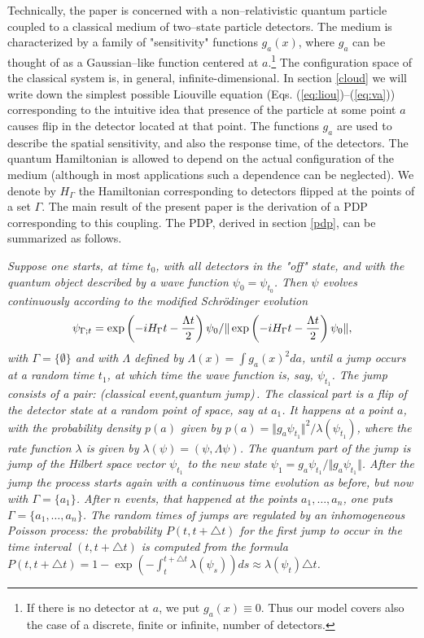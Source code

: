 \documentclass[12pt]{article}
\begin{document}
Technically, the paper is concerned with a non--relativistic quantum
particle coupled to a classical medium of two--state particle detectors.
The medium is characterized by a family of "sensitivity" functions
$g_a(x)$, where $g_a$ can be thought of as a Gaussian--like function
centered at $a$.\footnote{If there is no detector at $a$, we put
$g_a(x)\equiv0$. Thus our model covers also the case of a discrete, finite
or infinite, number of detectors.} The configuration space of the classical
system is, in general, infinite-dimensional. In section \ref{cloud} we will write down
the simplest possible Liouville equation (Eqs.
(\ref{eq:liou})--(\ref{eq:va})) corresponding to the intuitive idea that
presence of the particle at some point $a$ causes flip in the detector
located at that point. The functions $g_a$ are used to describe the spatial
sensitivity, and also the response time, of the detectors. The quantum
Hamiltonian is allowed to depend on the actual configuration of the medium
(although in most applications such a dependence can be neglected). We
denote by $H_\Gamma$ the Hamiltonian corresponding to detectors flipped at
the points of a set $\Gamma$. The main result of the present paper is the
derivation of a PDP corresponding to this coupling. The PDP, derived in section
\ref{pdp}, can be summarized as follows.

\medskip
{\sl Suppose one starts, at time $t_0$, with all detectors in the "off"
state, and with the quantum object described by a wave function $\psi
_0=\psi_{t_0}$. Then $\psi$ evolves continuously according to the modified
Schr\"odinger evolution
$$\psi_{\Gamma;t}=\exp\left(-iH_\Gamma t-{{\Lambda t}\over 2}\right)\psi_0
/{\Vert \exp\left(-iH_\Gamma t-{{\Lambda t}\over 2}\right)\psi_0\Vert},$$
with $\Gamma=\{\emptyset \}$ and with $\Lambda$ defined by $\Lambda
(x)=\int g_a(x)^2 da$, until a jump occurs at a random time $t_1$, at which
time the wave function is, say, $\psi_{t_1}$. The jump consists of a pair:
{\sl (classical event,quantum jump)}\,. The classical part is a flip of the
detector state at a random point of space, say at $a_1$. It happens at a
point $a$, with the probability density $p(a)$ given by  $p(a)=\Vert g_a
\psi_{t_1}\Vert^2/\lambda(\psi_{t_1})$,
where the rate function $\lambda$ is given by
$\lambda(\psi)=(\psi,\Lambda\psi)$. The quantum part of the jump is jump of
the Hilbert space vector $\psi_{t_1}$ to the new state
$\psi_1=g_{a}\psi_{t_1}/{\Vert g_{a}\psi_{t_1}\Vert}$. After the jump the
process starts again with a continuous time evolution as before, but now
with $\Gamma=\{a_1\}$. After $n$ events, that happened at the points
$a_1,\ldots ,a_n$, one puts $\Gamma=\{a_1,\ldots ,a_n\}$. The random times
of jumps are regulated by an inhomogeneous Poisson process: the probability
$P(t,t+\triangle t)$ for the first jump to occur in the time interval
$(t,t+\triangle t)$ is computed from the formula
$P(t,t+\triangle t)=1-\exp \left(-\int_t^{t+\triangle t}
\lambda(\psi_s)\right)ds\approx \lambda(\psi_t)\triangle t$.}
\medskip
\end{document}
